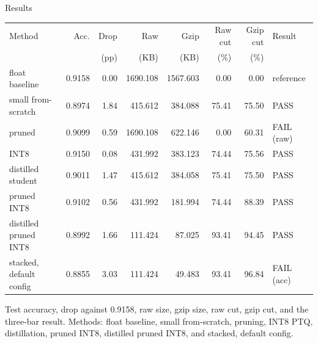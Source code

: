 \documentclass[aspectratio=169,11pt]{beamer}
\begin{document}
\begin{frame}[t]{Results}
  \vspace{0.35em}
  \begin{center}
  {\scriptsize
  \setlength{\tabcolsep}{3.2pt}%
  \begin{tabular}{@{}lrrrrrrl@{}}
  \toprule
  Method & Acc. & Drop & Raw & Gzip & Raw cut & Gzip cut & Result \\
   &  & (pp) & (KB) & (KB) & (\%) & (\%) &  \\
  \midrule
  float baseline & 0.9158 & 0.00 & 1690.108 & 1567.603 & 0.00 & 0.00 & reference \\
  small from-scratch & 0.8974 & 1.84 & 415.612 & 384.088 & 75.41 & 75.50 & PASS \\
  pruned & 0.9099 & 0.59 & 1690.108 & 622.146 & 0.00 & 60.31 & FAIL (raw) \\
  INT8 & 0.9150 & 0.08 & 431.992 & 383.123 & 74.44 & 75.56 & PASS \\
  distilled student & 0.9011 & 1.47 & 415.612 & 384.058 & 75.41 & 75.50 & PASS \\
  pruned INT8 & 0.9102 & 0.56 & 431.992 & 181.994 & 74.44 & 88.39 & PASS \\
  distilled pruned INT8 & 0.8992 & 1.66 & 111.424 & 87.025 & 93.41 & 94.45 & PASS \\
  stacked, default config & 0.8855 & 3.03 & 111.424 & 49.483 & 93.41 & 96.84 & FAIL (acc) \\
  \bottomrule
  \end{tabular}\par}
  \end{center}
  \vspace{0.15em}
  {\scriptsize Test accuracy, drop against 0.9158, raw size, gzip size, raw cut, gzip cut, and the three-bar result. Methods: float baseline, small from-scratch, pruning, INT8 PTQ, distillation, pruned INT8, distilled pruned INT8, and stacked, default config.\par}
\end{frame}
\end{document}
